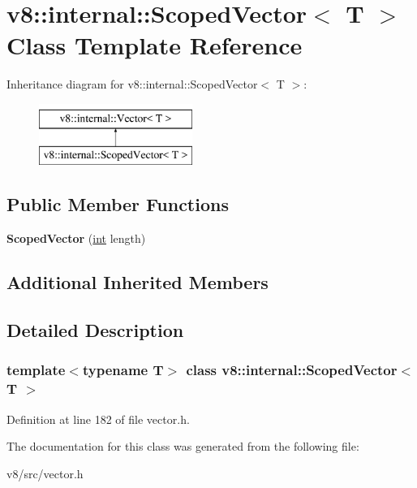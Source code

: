 \hypertarget{classv8_1_1internal_1_1ScopedVector}{}\section{v8\+:\+:internal\+:\+:Scoped\+Vector$<$ T $>$ Class Template Reference}
\label{classv8_1_1internal_1_1ScopedVector}
Inheritance diagram for v8\+:\+:internal\+:\+:Scoped\+Vector$<$ T $>$\+:\begin{figure}[H]
\begin{center}
\leavevmode
\includegraphics[height=2.000000cm]{classv8_1_1internal_1_1ScopedVector}
\end{center}
\end{figure}
\subsection*{Public Member Functions}
\begin{DoxyCompactItemize}
\item 
\mbox{\label{classv8_1_1internal_1_1ScopedVector_abf437127696dc144a2be43af4130f3c7}} 
{\bfseries Scoped\+Vector} (\mbox{\hyperlink{classint}{int}} length)
\end{DoxyCompactItemize}
\subsection*{Additional Inherited Members}


\subsection{Detailed Description}
\subsubsection*{template$<$typename T$>$\newline
class v8\+::internal\+::\+Scoped\+Vector$<$ T $>$}



Definition at line 182 of file vector.\+h.



The documentation for this class was generated from the following file\+:\begin{DoxyCompactItemize}
\item 
v8/src/vector.\+h\end{DoxyCompactItemize}
